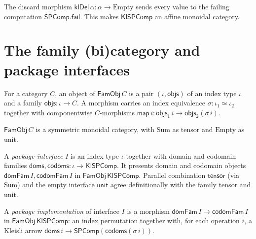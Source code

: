 \begin{definition}
  \label{def:klspcomp-del}
  \leanok
  The discard morphism $\mathsf{klDel}\,\alpha : \alpha \to \mathrm{Empty}$
  sends every value to the failing computation $\mathsf{SPComp.fail}$. This
  makes $\mathsf{KlSPComp}$ an affine monoidal category.
\end{definition}

\section{The family (bi)category and package interfaces}

\begin{definition}
  \label{def:famobj}
  \leanok
  For a category $C$, an object of $\mathsf{FamObj}\,C$ is a pair $(\iota,
  \mathsf{objs})$ of an index type $\iota$ and a family $\mathsf{objs} : \iota
  \to C$. A morphism carries an index equivalence $\sigma : \iota_1 \simeq
  \iota_2$ together with componentwise $C$-morphisms $\mathsf{map}\,i :
  \mathsf{objs}_1\,i \to \mathsf{objs}_2(\sigma\,i)$.
\end{definition}

$\mathsf{FamObj}\,C$ is a symmetric monoidal category, with $\mathrm{Sum}$ as tensor
and $\mathrm{Empty}$ as unit.

\begin{definition}
  \label{def:pkginterface}
  \leanok
  A \emph{package interface} $I$ is an index type $\iota$ together with domain
  and codomain families $\mathsf{doms}, \mathsf{codoms} : \iota \to
  \mathsf{KlSPComp}$. It presents domain and codomain objects
  $\mathsf{domFam}\,I, \mathsf{codomFam}\,I$ in $\mathsf{FamObj}\,
  \mathsf{KlSPComp}$. Parallel combination $\mathsf{tensor}$ (via $\mathrm{Sum}$)
  and the empty interface $\mathsf{unit}$ agree definitionally with the family
  tensor and unit.
\end{definition}

\begin{definition}
  \label{def:pkgimpl}
  \leanok
  A \emph{package implementation} of interface $I$ is a morphism
  $\mathsf{domFam}\,I \to \mathsf{codomFam}\,I$ in
  $\mathsf{FamObj}\,\mathsf{KlSPComp}$: an index permutation together with, for
  each operation $i$, a Kleisli arrow $\mathsf{doms}\,i \to
  \mathsf{SPComp}(\mathsf{codoms}(\sigma\,i))$.
\end{definition}


